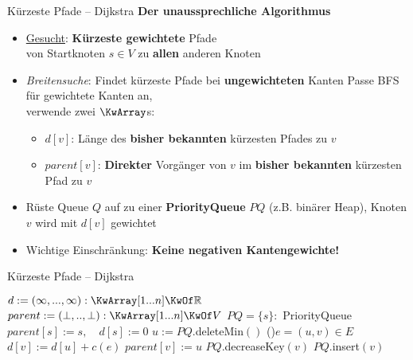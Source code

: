 \begin{frame}{Kürzeste Pfade – Dijkstra}
	\textbf{Der unaussprechliche Algorithmus} 
	\begin{itemize}
		\item \underline{Gesucht}: \textbf{Kürzeste gewichtete} Pfade \\
		von Startknoten $s \in V$ zu \textbf{allen} anderen Knoten
		\pause
		\item \textit{Breitensuche}: Findet kürzeste Pfade bei \textbf{ungewichteten} Kanten
		\pause
		\implitem Passe BFS für gewichtete Kanten an, \\
		verwende zwei $\KwArray$s:
		\begin{itemize}
			\item $d[v]$: Länge des \textbf{bisher bekannten} kürzesten Pfades zu $v$ 
			\vspace{.2\baselineskip}
			\item $parent[v]$: \textbf{Direkter} Vorgänger von $v$ im \textbf{bisher bekannten} kürzesten Pfad zu $v$
		\end{itemize}
		\pause
		\item Rüste Queue $Q$ auf zu einer \textbf{PriorityQueue} $PQ$ (z.B. binärer Heap), Knoten $v$ wird mit $d[v]$ gewichtet
		\pause
		\item Wichtige Einschränkung: \textbf{Keine negativen Kantengewichte!}
	\end{itemize}
\end{frame}

\begin{frame}{Kürzeste Pfade – Dijkstra}  \vspace{-.25\baselineskip}
	\begin{exampleblock}{} \vspace{-.4\baselineskip}
		\begin{algorithm}[H]
			\small
			 {
				$d := (\infty, ..., \infty) : \KwArray[1...n] \KwOf \R$\;
				$parent := (\bot, .., \bot) : \KwArray[1...n] \KwOf V$\;
				$PQ = \{s\} : $ PriorityQueue\;
				$parent[s] := s, \quad d[s] := 0$ \;
				 {
					$u := PQ.$deleteMin$()$  \;
					\ForEach(){$e = (u, v) \in E$} {
						 {
							$d[v] := d[u] +c(e)$\;
							$parent[v] := u$\;
							 {
								$PQ.$decreaseKey$(v)$\;
							}{
							$PQ.$insert$(v)$\;
							}
						}
					}
				}
				\;
			}
		\end{algorithm}
	\end{exampleblock}
\end{frame}

